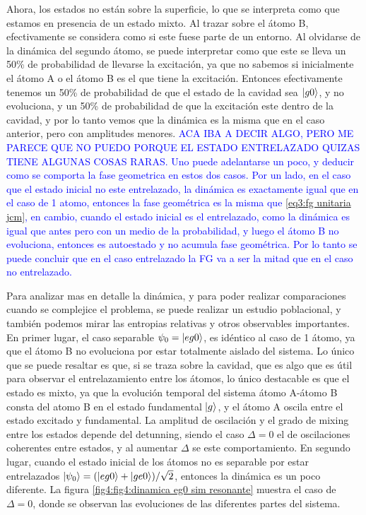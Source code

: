 Ahora, los estados no están sobre la superficie, lo que se interpreta como que estamos en presencia de un estado mixto. Al trazar sobre el átomo B, efectivamente se considera como si este fuese parte de un entorno. Al olvidarse de la dinámica del segundo átomo, se puede interpretar como que este se lleva un 50\% de probabilidad de llevarse la excitación, ya que no sabemos si inicialmente el átomo A o el átomo B es el que tiene la excitación. Entonces efectivamente tenemos un 50\% de probabilidad de que el estado de la cavidad sea $\ket{g0}$, y no evoluciona, y un 50\% de probabilidad de que la excitación este dentro de la cavidad, y por lo tanto vemos que la dinámica es la misma que en el caso anterior, pero con amplitudes menores. \textcolor{blue}{ACA IBA A DECIR ALGO, PERO ME PARECE QUE NO PUEDO PORQUE EL ESTADO ENTRELAZADO QUIZAS TIENE ALGUNAS COSAS RARAS. Uno puede adelantarse un poco, y deducir como se comporta la fase geometrica en estos dos casos. Por un lado, en el caso que el estado inicial no este entrelazado, la dinámica es exactamente igual que en el caso de 1 atomo, entonces la fase geométrica es la misma que \ref{eq3:fg unitaria jcm}, en cambio, cuando el estado inicial es el entrelazado, como la dinámica es igual que antes pero con un medio de la probabilidad, y luego el átomo B no evoluciona, entonces es autoestado y no acumula fase geométrica. Por lo tanto se puede concluir que en el caso entrelazado la FG va a ser la mitad que en el caso no entrelazado.}

Para analizar mas en detalle la dinámica, y para poder realizar comparaciones cuando se complejice el problema, se puede realizar un estudio poblacional, y también podemos mirar las entropias relativas y otros observables importantes.
En primer lugar, el caso separable $\psi_0=\ket{eg0}$, es idéntico al caso de 1 átomo, ya que el átomo B no evoluciona por estar totalmente aislado del sistema. Lo único que se puede resaltar es que, si se traza sobre la cavidad, que es algo que es útil para observar el entrelazamiento entre los átomos, lo único destacable es que el estado es mixto, ya que la evolución temporal del sistema átomo A-átomo B consta del atomo B en el estado fundamental $\ket{g}$, y el átomo A oscila entre el estado excitado y fundamental. La amplitud de oscilación y el grado de mixing entre los estados depende del detunning, siendo el caso $\Delta=0$ el de oscilaciones coherentes entre estados, y al aumentar $\Delta$ se este comportamiento.
En segundo lugar, cuando el estado inicial de los átomos no es separable por estar entrelazados $\ket{\psi_0}=(\ket{eg0} + \ket{ge0})/\sqrt{2}$, entonces la dinámica es un poco diferente. La figura \ref{fig4:fig4:dinamica eg0 sim resonante} muestra el caso de $\Delta=0$, donde se observan las evoluciones de las diferentes partes del sistema.

